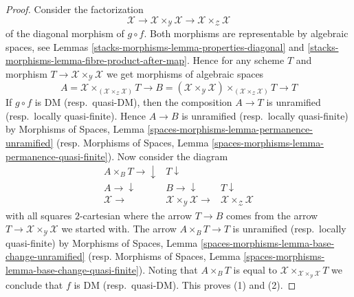 \begin{proof}
Consider the factorization
$$
\mathcal{X} \to
\mathcal{X} \times_\mathcal{Y} \mathcal{X} \to
\mathcal{X} \times_\mathcal{Z} \mathcal{X}
$$
of the diagonal morphism of $g \circ f$. Both morphisms are representable by
algebraic spaces, see
Lemmas \ref{stacks-morphisms-lemma-properties-diagonal} and
\ref{stacks-morphisms-lemma-fibre-product-after-map}.
Hence for any scheme $T$ and morphism
$T \to \mathcal{X} \times_\mathcal{Y} \mathcal{X}$
we get morphisms of algebraic spaces
$$
A = \mathcal{X} \times_{(\mathcal{X} \times_\mathcal{Z} \mathcal{X})} T
\longrightarrow
B = (\mathcal{X} \times_\mathcal{Y} \mathcal{X})
\times_{(\mathcal{X} \times_\mathcal{Z} \mathcal{X})} T
\longrightarrow
T
$$
If $g \circ f$ is DM (resp.\ quasi-DM), then the composition $A \to T$
is unramified (resp.\ locally quasi-finite). Hence $A \to B$ is
unramified (resp.\ locally quasi-finite) by
Morphisms of Spaces, Lemma
\ref{spaces-morphisms-lemma-permanence-unramified}
(resp.
Morphisms of Spaces,
Lemma \ref{spaces-morphisms-lemma-permanence-quasi-finite}).
Now consider the diagram
$$
\begin{array}{ccc}A \times_B T \longrightarrow\downarrow & T \downarrow &  \\ A \longrightarrow\downarrow & B \longrightarrow\downarrow & T \downarrow \\ \mathcal{X} \longrightarrow & \mathcal{X} \times_\mathcal{Y} \mathcal{X} \longrightarrow & \mathcal{X} \times_\mathcal{Z} \mathcal{X}\end{array}
$$
with all squares $2$-cartesian where the arrow $T \to B$ comes from the arrow
$T \to \mathcal{X} \times_\mathcal{Y} \mathcal{X}$ we started with.
The arrow $A \times_B T \to T$ is unramified (resp.\ locally quasi-finite)
by Morphisms of Spaces, Lemma
\ref{spaces-morphisms-lemma-base-change-unramified}
(resp.
Morphisms of Spaces,
Lemma \ref{spaces-morphisms-lemma-base-change-quasi-finite}).
Noting that $A \times_B T$ is equal to
$\mathcal{X} \times_{\mathcal{X} \times_\mathcal{Y} \mathcal{X}} T$
we conclude that $f$ is DM (resp.\ quasi-DM).
This proves (1) and (2).


\end{proof}
